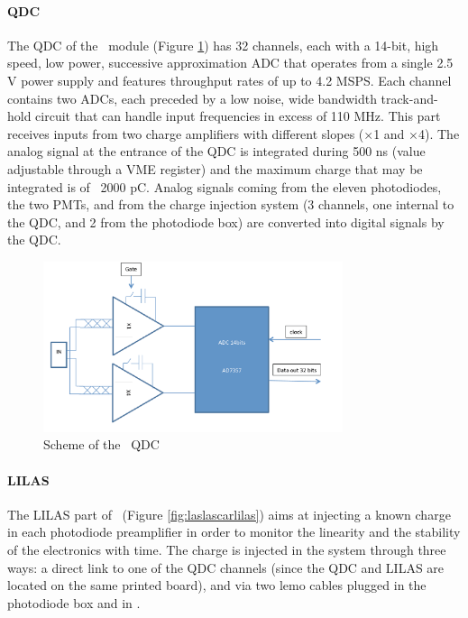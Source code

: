\paragraph{QDC}

The QDC of the \lascar~module (Figure \ref{fig:laslascarqdc}) has 32 channels, each with a 14-bit, high speed, low power, successive approximation ADC that operates from a single 2.5 V power supply and features throughput rates of up to 4.2 MSPS. Each channel contains two ADCs, each preceded by a low noise, wide bandwidth track-and-hold circuit that can handle input frequencies in excess of 110 MHz. This part receives inputs from two charge amplifiers with different slopes ($\times$1 and $\times$4). The analog signal at the entrance of the QDC is integrated during 500 ns (value adjustable through a VME register) and the maximum charge that may be integrated is of ~2000 pC. Analog signals coming from the eleven photodiodes, the two PMTs, and from the charge injection system (3 channels, one internal to the QDC, and 2 from the photodiode box) are converted into digital signals by the QDC. 
 
\begin{figure}[htbp]

\centering
\includegraphics[height=5cm]{figures/qdc.pdf}
\caption{Scheme of the \lascar~QDC}\label{fig:laslascarqdc}
\end{figure}

\paragraph{LILAS}
The LILAS part of \lascar~(Figure \ref{fig:laslascarlilas}) aims at injecting a known charge in each photodiode preamplifier in order to monitor the linearity and the stability of the electronics with time. The charge is injected in the system through three ways: a direct link to one of the QDC channels (since the QDC and LILAS are located on the same printed board), and via two lemo cables plugged in the photodiode box and in \phocal.  

